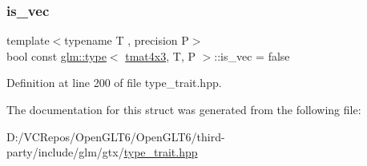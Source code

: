\subsubsection{\texorpdfstring{is\_vec}{is\_vec}}
{\footnotesize\ttfamily template$<$typename T , precision P$>$ \\
bool const \mbox{\hyperlink{structglm_1_1type}{glm\+::type}}$<$ \mbox{\hyperlink{structglm_1_1tmat4x3}{tmat4x3}}, T, P $>$\+::is\+\_\+vec = false\hspace{0.3cm}{\ttfamily [static]}}



Definition at line 200 of file type\+\_\+trait.\+hpp.



The documentation for this struct was generated from the following file\+:\begin{DoxyCompactItemize}
\item 
D\+:/\+V\+C\+Repos/\+Open\+G\+L\+T6/\+Open\+G\+L\+T6/third-\/party/include/glm/gtx/\mbox{\hyperlink{type__trait_8hpp}{type\+\_\+trait.\+hpp}}\end{DoxyCompactItemize}

